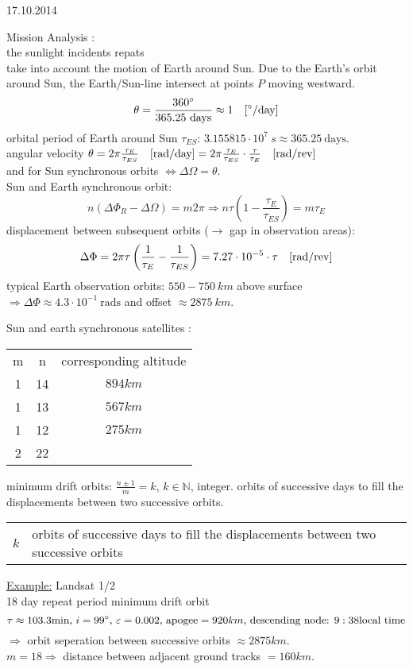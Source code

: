 \begin{chapter}{17.10.2014}
\begin{section}{Mission Analysis}
 \textbf{}: \\
 the sunlight incidents repats\\
 take into account the motion of Earth around Sun. Due to the Earth's orbit around Sun, the Earth/Sun-line intersect at points $P$ moving westward.
 \[ \theta = \frac{360\degree}{365.25 ~\text{days}} \approx 1 ~~~[\degree/\text{day}]\]
 orbital period of Earth around Sun $\tau_{ES}$: $3.155815 \cdot 10^7 ~s \approx 365.25 ~\text{days}$.\\
 angular velocity $\theta = 2 \pi \frac{\tau_E}{\tau_{ES}}~~~[\text{rad}/\text{day}] = 2\pi \frac{\tau_E}{\tau_{ES}}\cdot \frac{\tau}{\tau_E}~~~[\text{rad}/\text{rev}]$\\
 and for Sun synchronous orbits $\Leftrightarrow \Delta \Omega = \theta$.\\
 Sun and Earth synchronous orbit:
 \[ n(\Delta\Phi_R - \Delta\Omega) = m2\pi \Rightarrow n\tau\left(1-\frac{\tau_E}{\tau_{ES}}\right) = m\tau_E \]
 displacement between subsequent orbits ($\rightarrow$ gap in observation areas): 
 \[ \Delta\Phi = 2\pi\tau\left(\frac{1}{\tau_E}-\frac{1}{\tau_{ES}}\right) = 7.27\cdot10^{-5}\cdot \tau~~~[\text{rad}/\text{rev}] \]
 typical Earth observation orbits: $550 - 750~km$ above surface $\Rightarrow \Delta\Phi \approx 4.3\cdot 10^{-1} ~\text{rads}$ and offset $\approx 2875~km$.
 
 Sun and earth synchronous satellites :\\
 \begin{tabular}{ccc}
  m & n & corresponding altitude\\
  1&14&$894 km$\\
  1&13&$567 km$\\
  1&12&$275 km$\\
  2&22&\\
 \end{tabular}
 
 minimum drift orbits: $\frac{n \pm 1}{m} = k$, $k \in \mathbb{N}$, integer. orbits of successive days to fill the displacements between two successive orbits.\\
 \begin{tabular}{c|l|c}
  $k$ & orbits of successive days to fill the displacements between two successive orbits& 
 \end{tabular}
 
 \underline{Example:} Landsat 1/2\\
 18 day repeat period minimum drift orbit
 \[ \tau \approx 103.3\text{min, } i=99\degree \text{, } \varepsilon = 0.002\text{, apogee}=920km\text{, descending node: } 9:38 \text{local time}\]
 $\Rightarrow$ orbit seperation between successive orbits $\approx 2875km$.\\
 $m=18 \Rightarrow$ distance between adjacent ground tracks $=160km$.
 

\end{section}
\end{chapter}
